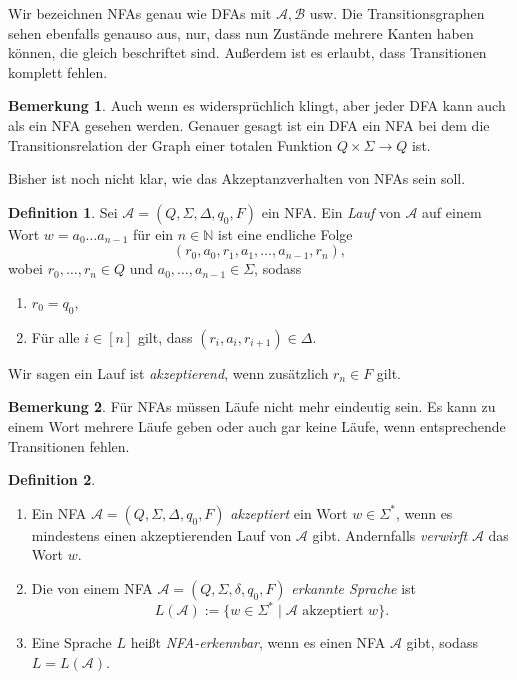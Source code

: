 \documentclass[11pt, a4paper]{article}
\theoremstyle{definition}
\newtheorem{definition}{Definition}[section]
\newtheorem*{remark*}{Bemerkung}
\theoremstyle{plain}
\numberwithin{equation}{section}
\begin{document}
Wir bezeichnen NFAs genau wie DFAs mit \( \mathcal{A}, \mathcal{B} \) usw. Die Transitionsgraphen sehen ebenfalls genauso aus, nur, dass nun Zustände mehrere Kanten haben können, die gleich beschriftet sind. Außerdem ist es erlaubt, dass Transitionen komplett fehlen. 
\begin{remark*}
	Auch wenn es widersprüchlich klingt, aber jeder DFA kann auch als ein NFA gesehen werden. Genauer gesagt ist ein DFA ein NFA bei dem die Transitionsrelation der Graph einer totalen Funktion \( Q \times \Sigma \to Q \) ist.
\end{remark*}
Bisher ist noch nicht klar, wie das Akzeptanzverhalten von NFAs sein soll.
\begin{definition}
	Sei \( \mathcal{A} = (Q, \Sigma, \Delta, q_0, F) \) ein NFA.
	Ein \textit{Lauf} von \( \mathcal{A} \) auf einem Wort \( w = a_0 \ldots a_{n-1} \) für ein \( n \in \mathbb{N} \) ist eine endliche Folge
	\[
		(r_0, a_0, r_1, a_1, \ldots, a_{n-1}, r_n),
	\]
	wobei \( r_0, \ldots, r_n \in Q \) und \( a_0, \ldots, a_{n-1} \in \Sigma \), sodass
	\begin{enumerate}
		\item \( r_0 = q_0 \),
		\item Für alle \( i \in [n] \) gilt, dass \( (r_i, a_i, r_{i+1}) \in \Delta \).
	\end{enumerate}
	Wir sagen ein Lauf ist \textit{akzeptierend}, wenn zusätzlich \( r_n \in F \) gilt.
\end{definition}
\begin{remark*}
	Für NFAs müssen Läufe nicht mehr eindeutig sein. Es kann zu einem Wort mehrere Läufe geben oder auch gar keine Läufe, wenn entsprechende Transitionen fehlen.
\end{remark*}
\begin{definition}
\
	\begin{enumerate}
		\item Ein NFA \( \mathcal{A} = (Q, \Sigma, \Delta, q_0, F) \) \textit{akzeptiert} ein Wort \( w \in \Sigma^\ast \), wenn es mindestens einen akzeptierenden Lauf von \( \mathcal{A} \) gibt. Andernfalls \textit{verwirft} \( \mathcal{A} \) das Wort \( w \).
		\item Die von einem NFA \( \mathcal{A} = (Q, \Sigma, \delta, q_0, F) \) \textit{erkannte Sprache} ist
			\[
				L(\mathcal{A}) := \{ w \in \Sigma^\ast \mid \mathcal{A} \text{ akzeptiert } w \}.
			\]
		\item Eine Sprache \( L \) heißt \textit{NFA-erkennbar}, wenn es einen NFA \( \mathcal{A} \) gibt, sodass \( L = L(\mathcal{A}) \).
	\end{enumerate}
\end{definition}
\end{document}
